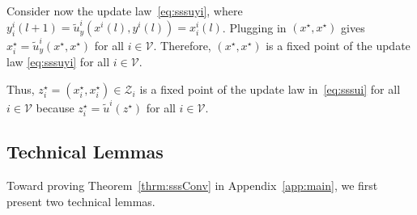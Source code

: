 \documentclass[9pt,shortpaper,twoside,web]{ieeecolor}
\newcommand{\Z}{\ensuremath{\mathcal{Z}}\xspace}
\newcommand{\V}{\ensuremath{\mathcal{V}}\xspace}
\begin{document}
    Consider now the update law~\eqref{eq:sssuyi}, where $y_i^i(l+1)=\tilde{u}^i_y(x^i(l),y^i(l))= x^i_i(l)$. 
    Plugging in $(x^\star,x^\star)$ gives $x^\star_i=\tilde{u}^i_y(x^\star,x^\star)$ for all $i\in\V$.
    Therefore, $(x^\star,x^\star)$ is a fixed point of the update law \eqref{eq:sssuyi} for all $i\in\V$.

    Thus, $z^\star_i=(x^\star_i,x_i^\star)\in\Z_i$ is a fixed point of the update law in~\eqref{eq:sssui} for all $i\in\V$ because $z^\star_i=\tilde{u}^i(z^\star)$ for all $i\in\V$.

    \subsection{Technical Lemmas} \label{app:tech}
    Toward proving Theorem~\ref{thrm:sssConv} in Appendix~\ref{app:main}, we first present two
    technical lemmas. 
\end{document}
